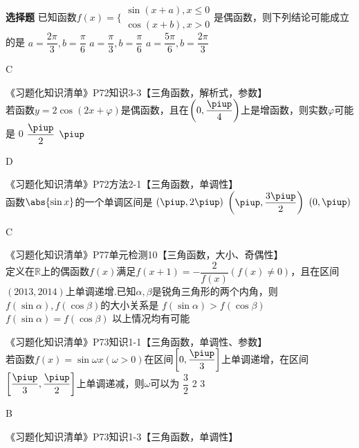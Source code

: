 \begin{exercise}{\bf 选择题}
       已知函数$f(x)=\Bigg\{\begin{aligned}
      \sin(x+a),x\le 0\\\cos (x+b),x>0
      \end{aligned}$是偶函数，则下列结论可能成立的是\xz
        {$ a=\dfrac{2\pi}{3},b=\dfrac{\pi}{6}$}
        {$a=\dfrac{\pi}{3},b=\dfrac{\pi}{6} $}
        {$ a=\dfrac{5\pi}{6},b=\dfrac{2\pi}{3}$}
      \begin{answer}
        C
      \end{answer}
    \item 《习题化知识清单》P72知识3-3【三角函数，解析式，参数】\\
      若函数$y=2\cos(2x+\varphi)$是偶函数，且在$\left(0,\dfrac{\piup}4\right)$上是增函数，则实数$\varphi$可能是\xz
        {0}
        {{$\dfrac{\piup}2$}}
        {$\piup$}
      \begin{answer}
        D
      \end{answer}
    \item 《习题化知识清单》P72方法2-1【三角函数，单调性】\\
      函数$\abs{\sin x}$的一个单调区间是\xz
        {$\left(\piup,2\piup\right)$}
        {$\left(\piup,\dfrac{3\piup}2\right)$}
        {$\left(0,\piup\right)$}
      \begin{answer}
        C
      \end{answer}
    \item 《习题化知识清单》P77单元检测10【三角函数，大小、奇偶性】\\
      定义在$\mathbb{R}$上的偶函数$f(x)$满足$f(x+1)=-\dfrac2{f(x)}(f(x)\neq0)$，且在区间$(2013,2014)$上单调递增.已知$\alpha,\beta$是锐角三角形的两个内角，则$f(\sin\alpha),f(\cos\beta)$的大小关系是\xz
        {$f(\sin\alpha)>f(\cos\beta)$}
        {$f(\sin\alpha)=f(\cos\beta)$}
        {以上情况均有可能}
    \item 《习题化知识清单》P73知识1-1【三角函数，单调性、参数】\\
      若函数$f(x)=\sin \omega x(\omega>0)$在区间$\left[0,\dfrac{\piup}3 \right]$上单调递增，在区间$\left[ \dfrac{\piup}3,\dfrac{\piup}2 \right]$上单调递减，则$\omega$可以为\xz
        {$\dfrac32$}
        {2}
        {3}
      \begin{answer}
        B
      \end{answer}
    \item 《习题化知识清单》P73知识1-3【三角函数，单调性】\\

\end{exercise}
